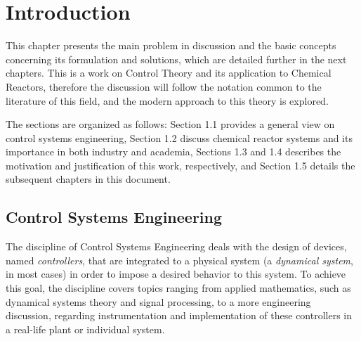 \documentclass[a4paper,11pt]{book}
\numberwithin{figure}{chapter}
\numberwithin{equation}{chapter}
\numberwithin{table}{chapter}
\theoremstyle{definition}
\begin{document}
%
\listoftables
\newpage

\clearpage
\mainmatter
\setcounter{page}{1}
\chapter{Introduction}

This chapter presents the main problem in discussion and the basic concepts concerning its formulation and solutions, which are detailed further in the next chapters. This is a work on Control Theory and its application to Chemical Reactors, therefore the discussion will follow the notation common to the literature of this field, and the modern approach to this theory is explored. 

The sections are organized as follows: Section 1.1 provides a general view on control systems engineering, Section 1.2 discuss chemical reactor systems and its importance in both industry and academia, Sections 1.3 and 1.4 describes the motivation and justification of this work, respectively, and Section 1.5 details the subsequent chapters in this document.

\section{Control Systems Engineering}

The discipline of Control Systems Engineering deals with the design of devices, named \textit{controllers}, that are integrated to a physical system (a \textit{dynamical system}, in most cases) in order to impose a desired behavior to this system. To achieve this goal, the discipline covers topics ranging from applied mathematics, such as dynamical systems theory and signal processing, to a more engineering discussion, regarding instrumentation and implementation of these controllers in a real-life plant or individual system. 
\end{document}
